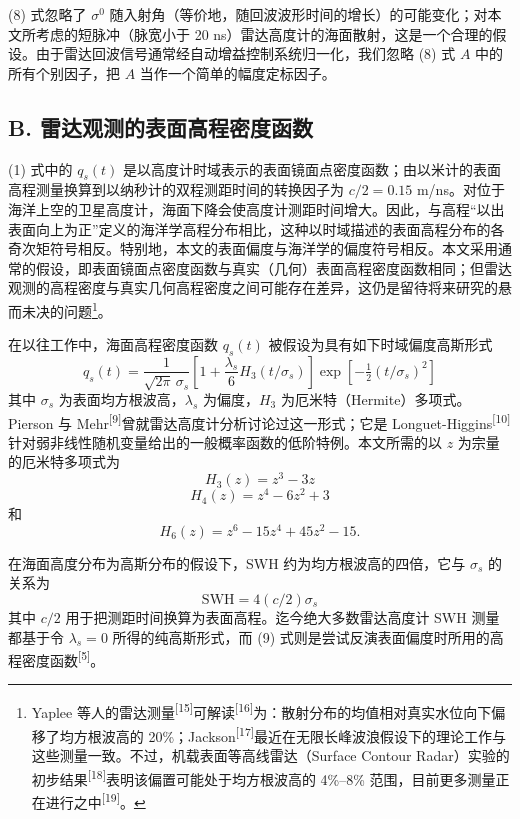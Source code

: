 (8) 式忽略了 $\sigma^{0}$ 随入射角（等价地，随回波波形时间的增长）的可能变化；对本文所考虑的短脉冲（脉宽小于 20 ns）雷达高度计的海面散射，这是一个合理的假设。由于雷达回波信号通常经自动增益控制系统归一化，我们忽略 (8) 式 $A$ 中的所有个别因子，把 $A$ 当作一个简单的幅度定标因子。

\subsection*{B. 雷达观测的表面高程密度函数}

(1) 式中的 $q_{s}(t)$ 是以高度计时域表示的表面镜面点密度函数；由以米计的表面高程测量换算到以纳秒计的双程测距时间的转换因子为 $c/2 = 0.15$ m/ns。对位于海洋上空的卫星高度计，海面下降会使高度计测距时间增大。因此，与高程“以出表面向上为正”定义的海洋学高程分布相比，这种以时域描述的表面高程分布的各奇次矩符号相反。特别地，本文的表面偏度与海洋学的偏度符号相反。本文采用通常的假设，即表面镜面点密度函数与真实（几何）表面高程密度函数相同；但雷达观测的高程密度与真实几何高程密度之间可能存在差异，这仍是留待将来研究的悬而未决的问题\footnote{Yaplee 等人的雷达测量\textsuperscript{[15]}可解读\textsuperscript{[16]}为：散射分布的均值相对真实水位向下偏移了均方根波高的 20\%；Jackson\textsuperscript{[17]}最近在无限长峰波浪假设下的理论工作与这些测量一致。不过，机载表面等高线雷达（Surface Contour Radar）实验的初步结果\textsuperscript{[18]}表明该偏置可能处于均方根波高的 4\%--8\% 范围，目前更多测量正在进行之中\textsuperscript{[19]}。}。

在以往工作中，海面高程密度函数 $q_{s}(t)$ 被假设为具有如下时域偏度高斯形式
\[
q_{s}(t) = \frac{1}{\sqrt{2\pi}\,\sigma_{s}}\left[1 + \frac{\lambda_{s}}{6}H_{3}(t/\sigma_{s})\right]\exp\left[-\tfrac{1}{2}\left(t/\sigma_{s}\right)^{2}\right]
\tag{9}
\]
其中 $\sigma_{s}$ 为表面均方根波高，$\lambda_{s}$ 为偏度，$H_{3}$ 为厄米特（Hermite）多项式。Pierson 与 Mehr\textsuperscript{[9]}曾就雷达高度计分析讨论过这一形式；它是 Longuet-Higgins\textsuperscript{[10]}针对弱非线性随机变量给出的一般概率函数的低阶特例。本文所需的以 $z$ 为宗量的厄米特多项式为
\[
H_{3}(z) = z^{3} - 3z
\tag{10}
\]
\[
H_{4}(z) = z^{4} - 6z^{2} + 3
\]
和
\[
H_{6}(z) = z^{6} - 15z^{4} + 45z^{2} - 15.
\]

在海面高度分布为高斯分布的假设下，SWH 约为均方根波高的四倍，它与 $\sigma_{s}$ 的关系为
\[
\mathrm{SWH} = 4(c/2)\sigma_{s}
\tag{11}
\]
其中 $c/2$ 用于把测距时间换算为表面高程。迄今绝大多数雷达高度计 SWH 测量都基于令 $\lambda_{s} = 0$ 所得的纯高斯形式，而 (9) 式则是尝试反演表面偏度时所用的高程密度函数\textsuperscript{[5]}。

